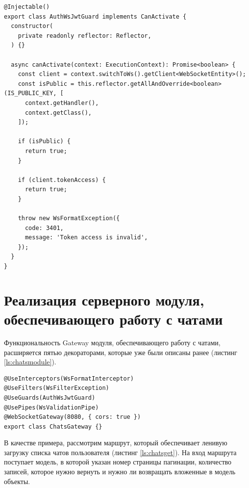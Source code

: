 \begin{lstlisting}[caption={Охранник, защищающий маршруты от несанкционированного доступа}, label={ls:authguard}]
@Injectable()
export class AuthWsJwtGuard implements CanActivate {
  constructor(
    private readonly reflector: Reflector,
  ) {}

  async canActivate(context: ExecutionContext): Promise<boolean> {
    const client = context.switchToWs().getClient<WebSocketEntity>();
    const isPublic = this.reflector.getAllAndOverride<boolean>(IS_PUBLIC_KEY, [
      context.getHandler(),
      context.getClass(),
    ]);

    if (isPublic) {
      return true;
    }

    if (client.tokenAccess) {
      return true;
    }

    throw new WsFormatException({
      code: 3401,
      message: 'Token access is invalid',
    });
  }
}
\end{lstlisting}

\section{Реализация серверного модуля, обеспечивающего работу с чатами}

Функциональность Gateway модуля, обеспечивающего работу с чатами, расширяется пятью декораторами, которые уже были описаны ранее (листинг \ref{ls:chatsmodule}).

\begin{lstlisting}[caption={Определение шлюза модуля, обеспечивающего работу с чатами}, label={ls:chatsmodule}]
@UseInterceptors(WsFormatInterceptor)
@UseFilters(WsFilterException)
@UseGuards(AuthWsJwtGuard)
@UsePipes(WsValidationPipe)
@WebSocketGateway(8080, { cors: true })
export class ChatsGateway {}
\end{lstlisting}

В качестве примера, рассмотрим маршрут, который обеспечивает ленивую загрузку списка чатов пользователя (листинг \ref{ls:chatsget}). На вход маршрута поступает модель, в которой указан номер страницы пагинации, количество записей, которое нужно вернуть и нужно ли возвращать вложенные в модель объекты.

